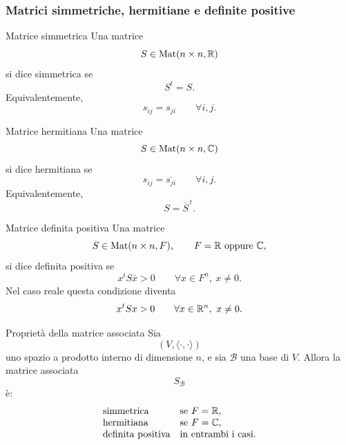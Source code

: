 \documentclass[a4paper]{article}
\begin{document}
\subsubsection{Matrici simmetriche, hermitiane e definite positive}

\begin{snippetdefinition}{Matrice simmetrica}
    Una matrice
    \[
        S\in\operatorname{Mat}(n\times n,\mathbb{R})
    \]
    si dice simmetrica se
    \[
        S^t=S.
    \]
    Equivalentemente,
    \[
        s_{ij}=s_{ji}
        \qquad
        \forall i,j.
    \]
\end{snippetdefinition}

\begin{snippetdefinition}{Matrice hermitiana}
    Una matrice
    \[
        S\in\operatorname{Mat}(n\times n,\mathbb{C})
    \]
    si dice hermitiana se
    \[
        s_{ij}=\overline{s_{ji}}
        \qquad
        \forall i,j.
    \]
    Equivalentemente,
    \[
        S=\overline{S}^{\,t}.
    \]
\end{snippetdefinition}

\begin{snippetdefinition}{Matrice definita positiva}
    Una matrice
    \[
        S\in\operatorname{Mat}(n\times n,F),
        \qquad
        F=\mathbb{R} \text{ oppure } \mathbb{C},
    \]
    si dice definita positiva se
    \[
        x^tS\overline{x}>0
        \qquad
        \forall x\in F^n,\ x\neq 0.
    \]
    Nel caso reale questa condizione diventa
    \[
        x^tSx>0
        \qquad
        \forall x\in\mathbb{R}^n,\ x\neq 0.
    \]
\end{snippetdefinition}

\begin{snippetproposition}{Proprietà della matrice associata}
    Sia
    \[
        (V,\langle\cdot,\cdot\rangle)
    \]
    uno spazio a prodotto interno di dimensione \(n\), e sia \(\mathcal{B}\) una base di \(V\). Allora la matrice associata
    \[
        S_{\mathcal{B}}
    \]
    è:
    \[
        \begin{array}{ll}
            \text{simmetrica} & \text{se } F=\mathbb{R},\\
            \text{hermitiana} & \text{se } F=\mathbb{C},\\
            \text{definita positiva} & \text{in entrambi i casi}.
        \end{array}
    \]
\end{snippetproposition}
\end{document}
